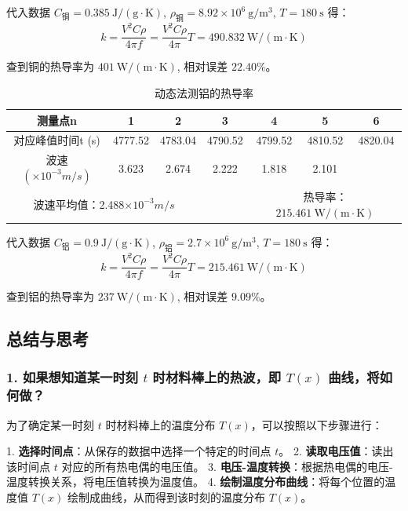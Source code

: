 \documentclass[zihao=5, UTF8]{article}
\theoremstyle{MyLineTheoremStyle} %
\theoremstyle{MyBlockTheoremStyle} %
\theoremstyle{MySubsubsectionStyle} %
\begin{document}
代入数据 $C_\text{铜}=0.385\ \mathrm{J/(g \cdot K)}$, $\rho_\text{铜}=8.92\times10^6\ \mathrm{g/m^3}$, $T=180\ \mathrm{s}$ 得：
\[
k = \frac{V^2 C \rho}{4\pi f} = \frac{V^2 C \rho}{4\pi} T = 490.832\ \mathrm{W/(m \cdot K)}
\]

查到铜的热导率为 $401\ \mathrm{W/(m \cdot K)}$, 相对误差 $22.40\%$。


\begin{table}[H]
    \centering
    \begin{tabular}{|c|c|c|c|c|c|c|}
    \hline
        测量点n & 1 & 2 & 3 & 4 & 5 & 6 \\ \hline
        对应峰值时间t (s) & 4777.52 & 4783.04 & 4790.52 & 4799.52 & 4810.52 & 4820.04 \\ \hline
        波速$(\times10^{-3}m/s)$ & 3.623 & 2.674 & 2.222 & 1.818 & 2.101 & ~ \\ \hline
        \multicolumn{3}{|c|}{波速平均值：2.488$\times10^{-3}m/s$} & ~ & \multicolumn{3}{c|}{热导率：$215.461\ \mathrm{W/(m \cdot K)}$} \\ \hline
    \end{tabular}
    \caption{动态法测铝的热导率}
\end{table}

代入数据 $C_\text{铝}=0.9\ \mathrm{J/(g \cdot K)}$, $\rho_\text{铝}=2.7\times10^6\ \mathrm{g/m^3}$, $T=180\ \mathrm{s}$ 得：
\[
k = \frac{V^2 C \rho}{4\pi f} = \frac{V^2 C \rho}{4\pi} T = 215.461\ \mathrm{W/(m \cdot K)}
\]

查到铝的热导率为 $237\ \mathrm{W/(m \cdot K)}$, 相对误差 $9.09\%$。


\subsection{总结与思考}

\subsubsection*{1. 如果想知道某一时刻 $ t $ 时材料棒上的热波，即 $ T(x) $ 曲线，将如何做？}

为了确定某一时刻 $ t $ 时材料棒上的温度分布 $ T(x) $，可以按照以下步骤进行：

1. \textbf{选择时间点}：从保存的数据中选择一个特定的时间点 $ t $。
2. \textbf{读取电压值}：读出该时间点 $ t $ 对应的所有热电偶的电压值。
3. \textbf{电压-温度转换}：根据热电偶的电压-温度转换关系，将电压值转换为温度值。
4. \textbf{绘制温度分布曲线}：将每个位置的温度值 $ T(x) $ 绘制成曲线，从而得到该时刻的温度分布 $ T(x) $。
\end{document}

